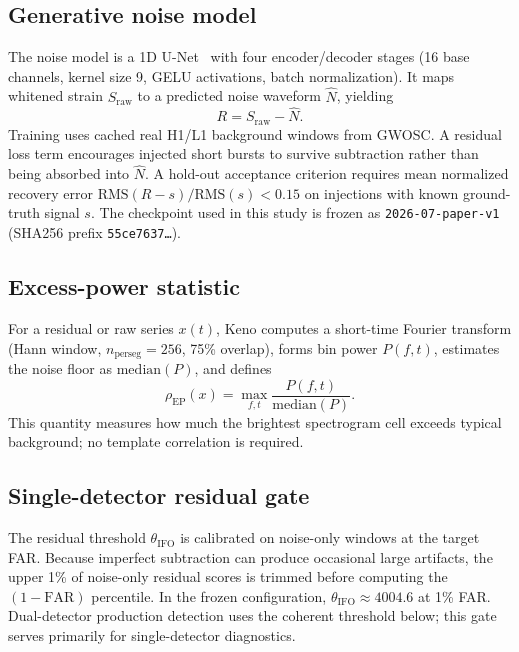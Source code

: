 \documentclass[11pt,a4paper]{article}
\begin{document}
\subsection{Generative noise model}
The noise model is a 1D U-Net~\citep{ronneberger2015} with four encoder/decoder
stages (16 base channels, kernel size 9, GELU activations, batch
normalization). It maps whitened strain $S_{\mathrm{raw}}$ to a predicted noise
waveform $\hat{N}$, yielding
\begin{equation}
R = S_{\mathrm{raw}} - \hat{N}.
\end{equation}
Training uses cached real H1/L1 background windows from GWOSC. A residual loss
term encourages injected short bursts to survive subtraction rather than being
absorbed into $\hat{N}$. A hold-out acceptance criterion requires mean
normalized recovery error $\mathrm{RMS}(R-s)/\mathrm{RMS}(s)<0.15$ on
injections with known ground-truth signal $s$. The checkpoint used in this
study is frozen as \texttt{2026-07-paper-v1} (SHA256 prefix
\texttt{55ce7637\ldots}).

\subsection{Excess-power statistic}
For a residual or raw series $x(t)$, Keno computes a short-time Fourier
transform (Hann window, $n_{\mathrm{perseg}}=256$, 75\% overlap), forms bin
power $P(f,t)$, estimates the noise floor as $\mathrm{median}(P)$, and defines
\begin{equation}
\rho_{\mathrm{EP}}(x)
  = \max_{f,t}\frac{P(f,t)}{\mathrm{median}(P)}.
\end{equation}
This quantity measures how much the brightest spectrogram cell exceeds typical
background; no template correlation is required.

\subsection{Single-detector residual gate}
The residual threshold $\theta_{\mathrm{IFO}}$ is calibrated on noise-only
windows at the target FAR. Because imperfect subtraction can produce occasional
large artifacts, the upper 1\% of noise-only residual scores is trimmed before
computing the $(1-\mathrm{FAR})$ percentile. In the frozen configuration,
$\theta_{\mathrm{IFO}}\approx 4004.6$ at 1\% FAR. Dual-detector production
detection uses the coherent threshold below; this gate serves primarily for
single-detector diagnostics.
\end{document}
